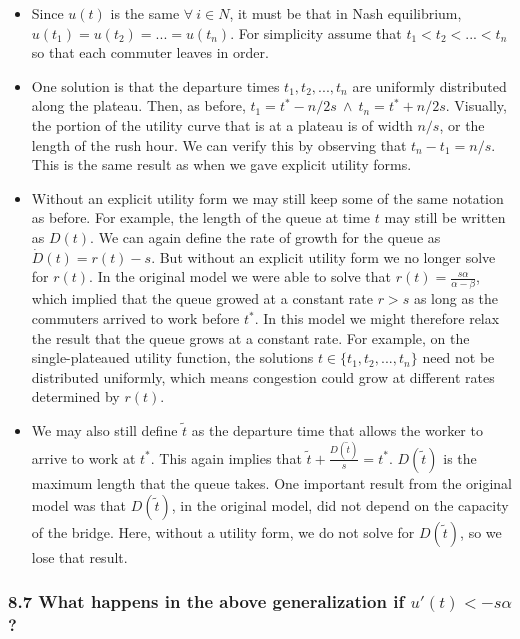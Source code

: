 \documentclass[]{article}
\begin{document}
\begin{itemize}
\item
  Since \(u(t)\) is the same \(\forall \ i \in N\), it must be that in
  Nash equilibrium, \(u(t_1)=u(t_2)=...=u(t_n)\). For simplicity assume
  that \(t_1<t_2<...<t_n\) so that each commuter leaves in order.
\item
  One solution is that the departure times \(t_1, t_2, ..., t_n\) are
  uniformly distributed along the plateau. Then, as before,
  \(t_1 = t^* - n/2s \ \wedge \ t_n = t^* + n/2s\). Visually, the
  portion of the utility curve that is at a plateau is of width \(n/s\),
  or the length of the rush hour. We can verify this by observing that
  \(t_n - t_1 = n/s\). This is the same result as when we gave explicit
  utility forms.
\item
  Without an explicit utility form we may still keep some of the same
  notation as before. For example, the length of the queue at time \(t\)
  may still be written as \(D(t)\). We can again define the rate of
  growth for the queue as \(\dot{D}(t) = r(t) - s\). But without an
  explicit utility form we no longer solve for \(r(t)\). In the original
  model we were able to solve that
  \(r(t) = \frac{s \alpha}{\alpha - \beta}\), which implied that the
  queue growed at a constant rate \(r>s\) as long as the commuters
  arrived to work before \(t^*\). In this model we might therefore relax
  the result that the queue grows at a constant rate. For example, on
  the single-plateaued utility function, the solutions
  \(t \in \{t_1,t_2,...,t_n\}\) need not be distributed uniformly, which
  means congestion could grow at different rates determined by \(r(t)\).
\item
  We may also still define \(\tilde{t}\) as the departure time that
  allows the worker to arrive to work at \(t^*\). This again implies
  that \(\tilde{t}+\frac{D(\tilde{t})}{s}=t^*\). \(D(\tilde{t})\) is the
  maximum length that the queue takes. One important result from the
  original model was that \(D(\tilde{t})\), in the original model, did
  not depend on the capacity of the bridge. Here, without a utility
  form, we do not solve for \(D(\tilde{t})\), so we lose that result.
\end{itemize}

\subsubsection{\texorpdfstring{8.7 What happens in the above
generalization if
\(u'(t) < -s\alpha\)?}{8.7 What happens in the above generalization if u'(t) \textless{} -s\textbackslash{}alpha?}}\label{what-happens-in-the-above-generalization-if-ut--salpha}
\end{document}

